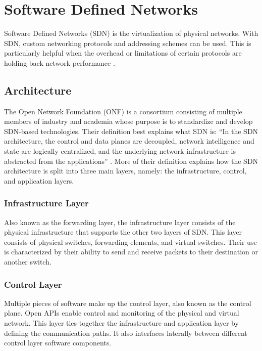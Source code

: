 \documentclass[fullapage,12pt]{article}
\begin{document}
\section{Software Defined Networks} \label{sec:sdn}

Software Defined Networks (SDN) is the virtualization of physical networks. With SDN, custom networking protocols and addressing schemes can be used. This is particularly helpful when the overhead or limitations of certain protocols are holding back network performance \cite{Jennings2015}.

\cite{yan2016software}

\subsection{Architecture}

The Open Network Foundation (ONF) is a consortium consisting of multiple members of industry and academia whose purpose is to standardize and develop SDN-based technologies. Their definition best explains what SDN is: ``In the SDN architecture, the control and data planes are decoupled, network intelligence and state are logically centralized, and the underlying network infrastructure is abstracted
from the applications'' \cite{onfSDNdef}. More of their definition explains how the SDN architecture is split into three main layers, namely: the infrastructure, control, and application layers.

\subsubsection{Infrastructure Layer}

Also known as the forwarding layer, the infrastructure layer consists of the physical infrastructure that supports the other two layers of SDN. This layer consists of physical switches, forwarding elements, and virtual switches. Their use is characterized by their ability to send and receive packets to their destination or another switch.


\subsubsection{Control Layer}

Multiple pieces of software make up the control layer, also known as the control plane. Open APIs enable control and monitoring of the physical and virtual network. This layer ties together the infrastructure and application layer by defining the communication paths. It also interfaces laterally between different control layer software components.
\end{document}
